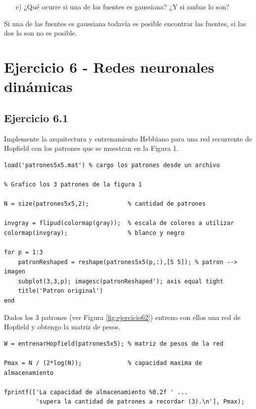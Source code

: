 \documentclass[11pt,a4paper,final]{article}
\begin{document}
\begin{enumerate}

   \item[e)]  ¿Qué ocurre si una de las fuentes es gaussiana? ¿Y si ambas lo son?
\end{enumerate}

Si una de las fuentes es gaussiana todavía es posible encontrar las fuentes, si las dos lo son no es posible.

\clearpage









\section{Ejercicio 6 - Redes neuronales dinámicas}

\subsection{Ejercicio 6.1}

Implemente la arquitectura y entrenamiento Hebbiano para una red recurrente de Hopfield con los patrones que se muestran en la Figura 1.

\begin{verbatim}
load('patrones5x5.mat') % cargo los patrones desde un archivo

% Grafico los 3 patrones de la figura 1

N = size(patrones5x5,2);           % cantidad de patrones

invgray = flipud(colormap(gray));  % escala de colores a utilizar
colormap(invgray);                 % blanco y negro

for p = 1:3
    patronReshaped = reshape(patrones5x5(p,:),[5 5]); % patron --> imagen
    subplot(3,3,p); imagesc(patronReshaped'); axis equal tight
    title('Patron original')
end
\end{verbatim}

Dados los 3 patrones (ver Figura \ref{fig:ejercicio62}) entreno con ellos una red de Hopfield y obtengo la matriz de pesos.

\begin{verbatim}
W = entrenarHopfield(patrones5x5); % matriz de pesos de la red

Pmax = N / (2*log(N));             % capacidad maxima de almacenamiento

fprintf(['La capacidad de almacenamiento %0.2f ' ...
         'supera la cantidad de patrones a recordar (3).\n'], Pmax);
\end{verbatim}
\end{document}
